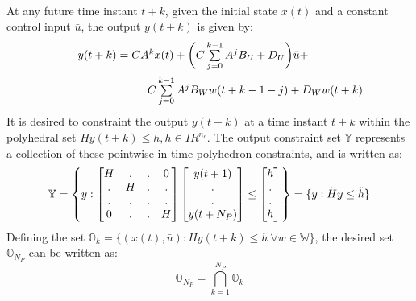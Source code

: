 \documentclass[letterpaper, 10 pt, conference]{ieeeconf}  %
\begin{document}
  \\
  At any future time instant $t+k$, given the initial state $x(t)$ and a constant control input $\bar{u}$, the output $y(t+k)$ is given by:
  	\begin{equation}
  	\hspace{-30pt}
  	\begin{aligned}
  	\begin{matrix}
  	y(t+k) = CA^{k}x(t) + \bigg( C\sum\limits_{j=0}^{k-1}A^{j}B_U + D_{U} \bigg)\bar{u} + \vspace{5pt}\\  \hspace{110pt} C\sum\limits_{j=0}^{k-1}A^jB_Ww(t+k-1-j) + D_{W} w(t+k)
  	\end{matrix}
  	\end{aligned}
  	\label{elongform}
  	\end{equation}
  	It is desired to constraint the output $y(t+k)$ at a time instant $t+k$ within the polyhedral set $Hy(t+k) \leq h, h \in I\!R^{n_c}$.
  The output constraint set $\mathbb{Y}$ represents a collection of these pointwise in time polyhedron constraints, and is written as:
  \begin{equation*}
  \small
  \mathbb{Y}=\begin{Bmatrix}y:
  \begin{bmatrix}
  H & . & . & 0 \\
  . & H & . & .\\
  . & . & . & . \\
  0 & . & . & H
  \end{bmatrix}
  \begin{bmatrix}
  y(t+1) \\ . \\ . \\ y(t+N_P)
  \end{bmatrix}
  \leq \begin{bmatrix}
  h \\ . \\ . \\  h
  \end{bmatrix}
  \end{Bmatrix} = 
  \{ y: \tilde{H} y \leq \tilde{h} \}
  \end{equation*}
  \iffalse
  Defining the set $\mathbb{O}_k=\{(x(t),\bar{u}):Hy(t+k)\leq h\ \forall w \in \mathbb{W}\}$, the desired set $\mathbb{O}_{N_P}$ can be written as:
  \begin{equation*}
  \mathbb{O}_{N_P}=\bigcap^{N_P}_{k=1} \mathbb{O}_k
  \end{equation*}
\end{document}
